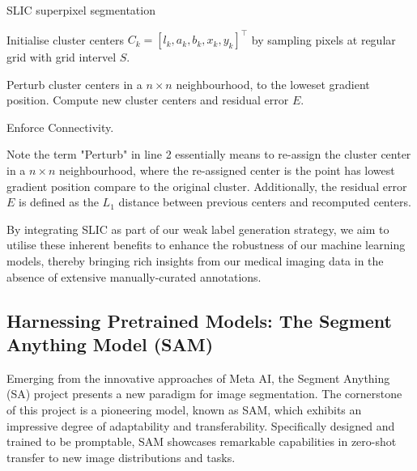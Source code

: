 \begin{algorithm}[H]
\caption{SLIC superpixel segmentation}\label{alg:slic}
\begin{algorithmic}[1]
\item Initialise cluster centers \(C_{k} = \left[l_{k}, a_{k}, b_{k}, x_{k}, y_{k}\right]^{\top}\) by sampling pixels at regular grid with grid intervel \(S\).
\item Perturb cluster centers in a \(n \times n\) neighbourhood, to the loweset gradient position.
    \EndFor
    \State Compute new cluster centers and residual error \(E\).
\EndWhile
\item Enforce Connectivity.
\end{algorithmic}
\end{algorithm}

Note the term "Perturb" in line 2 essentially means to re-assign the cluster center in a \(n \times  n\) neighbourhood, where the re-assigned center is the point has lowest gradient position compare to the original cluster. Additionally, the residual error \(E\) is defined as the \(L_{1}\) distance between previous centers and recomputed centers.

By integrating SLIC as part of our weak label generation strategy, we aim to utilise these inherent benefits to enhance the robustness of our machine learning models, thereby bringing rich insights from our medical imaging data in the absence of extensive manually-curated annotations.

\subsection{Harnessing Pretrained Models: The Segment Anything Model (SAM)}
Emerging from the innovative approaches of Meta AI, the Segment Anything (SA) project presents a new paradigm for image segmentation. The cornerstone of this project is a pioneering model, known as SAM, which exhibits an impressive degree of adaptability and transferability. Specifically designed and trained to be promptable, SAM showcases remarkable capabilities in zero-shot transfer to new image distributions and tasks.

